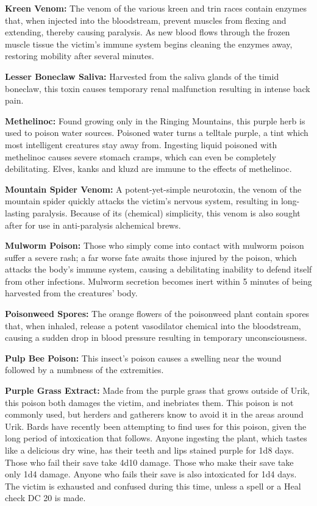 \textbf{Kreen Venom:} The venom of the various kreen and trin races contain enzymes that, when injected into the bloodstream, prevent muscles from flexing and extending, thereby causing paralysis. As new blood flows through the frozen muscle tissue the victim's immune system begins cleaning the enzymes away, restoring mobility after several minutes.

\textbf{Lesser Boneclaw Saliva:} Harvested from the saliva glands of the timid boneclaw, this toxin causes temporary renal malfunction resulting in intense back pain.

\textbf{Methelinoc:} Found growing only in the Ringing Mountains, this purple herb is used to poison water sources. Poisoned water turns a telltale purple, a tint which most intelligent creatures stay away from. Ingesting liquid poisoned with methelinoc causes severe stomach cramps, which can even be completely debilitating. Elves, kanks and kluzd are immune to the effects of methelinoc.

\textbf{Mountain Spider Venom:} A potent-yet-simple neurotoxin, the venom of the mountain spider quickly attacks the victim's nervous system, resulting in long-lasting paralysis. Because of its (chemical) simplicity, this venom is also sought after for use in anti-paralysis alchemical brews.

\textbf{Mulworm Poison:} Those who simply come into contact with mulworm poison suffer a severe rash; a far worse fate awaits those injured by the poison, which attacks the body's immune system, causing a debilitating inability to defend itself from other infections. Mulworm secretion becomes inert within 5 minutes of being harvested from the creatures' body.

\textbf{Poisonweed Spores:} The orange flowers of the poisonweed plant contain spores that, when inhaled, release a potent vasodilator chemical into the bloodstream, causing a sudden drop in blood pressure resulting in temporary unconsciousness.

\textbf{Pulp Bee Poison:} This insect's poison causes a swelling near the wound followed by a numbness of the extremities.

\textbf{Purple Grass Extract:} Made from the purple grass that grows outside of Urik, this poison both damages the victim, and inebriates them. This poison is not commonly used, but herders and gatherers know to avoid it in the areas around Urik. Bards have recently been attempting to find uses for this poison, given the long period of intoxication that follows. Anyone ingesting the plant, which tastes like a delicious dry wine, has their teeth and lips stained purple for 1d8 days. Those who fail their save take 4d10 damage. Those who make their save take only 1d4 damage. Anyone who fails their save is also intoxicated for 1d4 days. The victim is exhausted and confused during this time, unless a  spell or a Heal check DC 20 is made.

